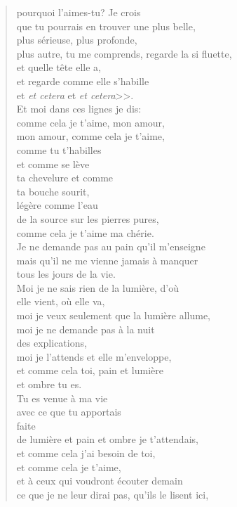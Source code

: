 \documentclass[11pt,a4paper]{book}
\begin{document}
\begin{verse}
pourquoi l'aimes-tu? Je crois \\
que tu pourrais en trouver une plus belle, \\
plus sérieuse, plus profonde, \\
plus autre, tu me comprends, regarde la si fluette, \\
et quelle tête elle a, \\
et regarde comme elle s'habille \\
et {\em et cetera} et {\em et cetera}>>. \\
Et moi dans ces lignes je dis: \\
comme cela je t'aime, mon amour, \\
mon amour, comme cela je t'aime, \\
comme tu t'habilles \\
et comme se lève \\
ta chevelure et comme \\
ta bouche sourit, \\
légère comme l'eau \\
de la source sur les pierres pures, \\
comme cela je t'aime ma chérie. \\
Je ne demande pas au pain qu'il m'enseigne \\
mais qu'il ne me vienne jamais à manquer \\
tous les jours de la vie. \\
Moi je ne sais rien de la lumière, d'où \\
elle vient, où elle va, \\
moi je veux seulement que la lumière allume, \\
moi je ne demande pas à la nuit \\
des explications, \\
moi je l'attends et elle m'enveloppe, \\
et comme cela toi, pain et lumière \\
et ombre tu es. \\
Tu es venue à ma vie \\
avec ce que tu apportais \\
faite \\
de lumière et pain et ombre je t'attendais, \\
et comme cela j'ai besoin de toi, \\
et comme cela je t'aime, \\
et à ceux qui voudront écouter demain \\
ce que je ne leur dirai pas, qu'ils le lisent ici, \\

\end{verse}
\end{document}

